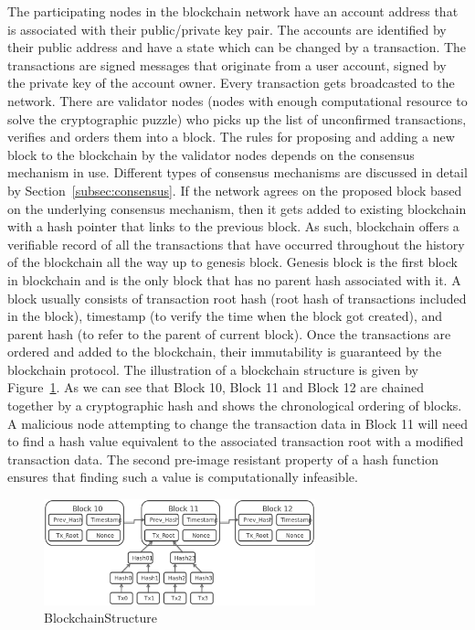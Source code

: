 The participating nodes in the blockchain network have an account address that
is associated with their public/private key pair. The accounts are identified
by their public address and have a state which can be changed by a transaction.
The transactions are signed messages that originate from a user account, signed
by the private key of the account owner. Every transaction gets broadcasted to
the network. There are validator nodes (nodes with enough computational
resource to solve the cryptographic puzzle) who picks up the list of
unconfirmed transactions, verifies and orders them into a block. The rules for
proposing and adding a new block to the blockchain by the validator nodes
depends on the consensus mechanism in use. Different types of consensus
mechanisms are discussed in detail by Section~\ref{subsec:consensus}. If the
network agrees on the proposed block based on the underlying consensus
mechanism, then it gets added to existing blockchain with a hash pointer that
links to the previous block. As such, blockchain offers a verifiable record of
all the transactions that have occurred throughout the history of the
blockchain all the way up to genesis block. Genesis block is the first block in
blockchain and is the only block that has no parent hash associated with it. A
block usually consists of transaction root hash (root hash of transactions
included in the block), timestamp (to verify the time when the block got
created), and parent hash (to refer to the parent of current block). Once the
transactions are ordered and added to the blockchain, their immutability is
guaranteed by the blockchain protocol. The illustration of a blockchain
structure is given by Figure~\ref{BlockchainStructure}. As we can see that
Block 10, Block 11 and Block 12 are chained together by a cryptographic hash
and shows the chronological ordering of blocks. A malicious node attempting to
change the transaction data in Block 11 will need to find a hash value
equivalent to the associated transaction root with a modified transaction data.
The second pre-image resistant property of a hash function ensures that finding
such a value is computationally infeasible.  
\begin{figure}
	\centering
	\includegraphics[width=0.7\textwidth]{Images/BlockchainStructure.eps}
	\caption{BlockchainStructure}
	\label{BlockchainStructure}
\end{figure}
